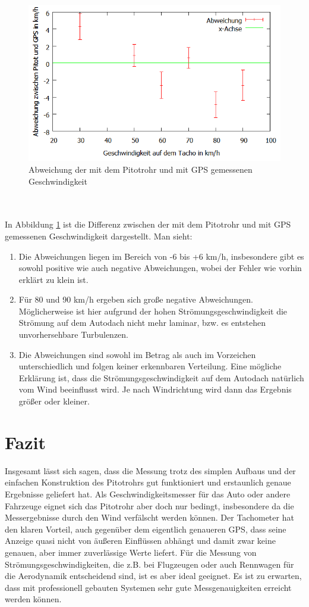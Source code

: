 \begin{figure}
      \includegraphics[width=.9\textwidth]{images/AbweichungGPSPitot}
\caption{Abweichung der mit dem Pitotrohr und mit GPS gemessenen Geschwindigkeit}
\label{fig:AbweichungGPSPitot}
\end{figure}
\\
\\
In Abbildung \ref{fig:AbweichungGPSPitot} ist die Differenz zwischen der mit dem Pitotrohr und mit GPS gemessenen Geschwindigkeit dargestellt. Man sieht:
\begin{enumerate}
\item Die Abweichungen liegen im Bereich von -6 bis +6 km/h, insbesondere gibt es sowohl positive wie auch negative Abweichungen, wobei der Fehler wie vorhin erklärt zu klein ist.
\item Für 80 und 90 km/h ergeben sich große negative Abweichungen. Möglicherweise ist hier aufgrund der hohen Strömungsgeschwindigkeit die Strömung auf dem Autodach nicht mehr laminar, bzw. es entstehen unvorhersehbare Turbulenzen.
\item Die Abweichungen sind sowohl im Betrag als auch im Vorzeichen unterschiedlich und folgen keiner erkennbaren Verteilung. Eine mögliche Erklärung ist, dass die Strömungsgeschwindigkeit auf dem Autodach natürlich vom Wind beeinflusst wird. Je nach Windrichtung wird dann das Ergebnis größer oder kleiner.
\end{enumerate}

\section{Fazit}
Insgesamt lässt sich sagen, dass die Messung trotz des simplen Aufbaus und der einfachen Konstruktion des Pitotrohrs gut funktioniert und erstaunlich genaue Ergebnisse geliefert hat. Als Geschwindigkeitsmesser für das Auto oder andere Fahrzeuge eignet sich das Pitotrohr aber doch nur bedingt, insbesondere da die Messergebnisse durch den Wind verfälscht werden können. Der Tachometer hat den klaren Vorteil, auch gegenüber dem eigentlich genaueren GPS, dass seine Anzeige quasi nicht von äußeren Einflüssen abhängt und damit zwar keine genauen, aber immer zuverlässige Werte liefert. Für die Messung von Strömungsgeschwindigkeiten, die z.B. bei Flugzeugen oder auch Rennwagen für die Aerodynamik entscheidend sind, ist es aber ideal geeignet. Es ist zu erwarten, dass mit professionell gebauten Systemen sehr gute Messgenauigkeiten erreicht werden können.